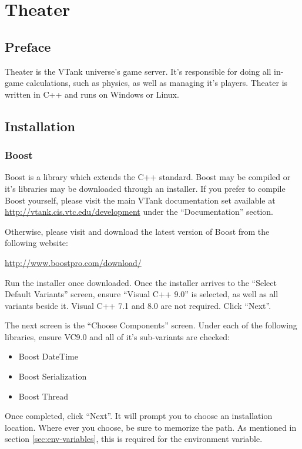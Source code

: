\chapter{Theater}

\section{Preface}

Theater is the VTank universe's game server. It's responsible for doing all in-game calculations, such as physics, as well as managing it's players. Theater is written in C++ and runs on Windows or Linux.

\section{Installation}

\subsection{Boost}

Boost is a library which extends the C++ standard. Boost may be compiled or it's libraries may be downloaded through an installer. If you prefer to compile Boost yourself, please visit the main VTank documentation set available at \url{http://vtank.cis.vtc.edu/development} under the ``Documentation'' section.

Otherwise, please visit and download the latest version of Boost from the following website:

\url{http://www.boostpro.com/download/}

Run the installer once downloaded. Once the installer arrives to the ``Select Default Variants'' screen, ensure ``Visual C++ 9.0'' is selected, as well as all variants beside it. Visual C++ 7.1 and 8.0 are not required. Click ``Next''.

The next screen is the ``Choose Components'' screen. Under each of the following libraries, ensure VC9.0 and all of it's sub-variants are checked:

\begin{itemize}
	\item Boost DateTime
	\item Boost Serialization
	\item Boost Thread
\end{itemize}

Once completed, click ``Next''. It will prompt you to choose an installation location. Where ever you choose, be sure to memorize the path. As mentioned in section \ref{sec:env-variables}, this is required for the  environment variable.

